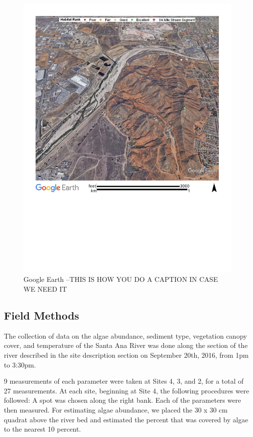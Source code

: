 \documentclass{article}\usepackage[]{graphicx}\usepackage[]{color}
\begin{document}
\begin{figure}
\includegraphics[width=1.00\textwidth]{Figures/SantaAna_SatelliteImage}
\caption{Google Earth --THIS IS HOW YOU DO A CAPTION IN CASE WE NEED IT}
\label{SAR_Image}
\end{figure}

\subsection{Field Methods}
The collection of data on the algae abundance, sediment type, vegetation canopy cover, 
and temperature of the Santa Ana River was done along the section of the river described
in the site description section on September 20th, 2016, from 1pm to 3:30pm.

9 measurements of each parameter were taken at Sites 4, 3, and 2, for a total of 27 measurements. 
At each site, beginning at Site 4, the following procedures were followed: 
A spot was chosen along the right bank. Each of the parameters were then measured.
For estimating algae abundance, we placed the 30  x 30 cm quadrat above the river bed and estimated
the percent that was covered by algae to the nearest 10 percent.
\end{document}
